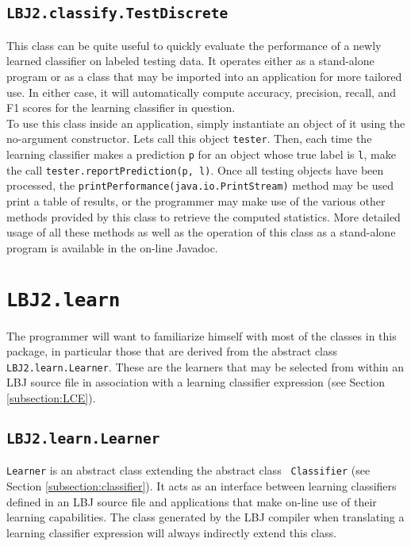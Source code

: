 \subsection{{\tt LBJ2.classify.TestDiscrete}} \label{subsection:testDiscrete}
This class can be quite useful to quickly evaluate the performance of a newly
learned classifier on labeled testing data.  It operates either as a
stand-alone program or as a class that may be imported into an application for
more tailored use.  In either case, it will automatically compute accuracy,
precision, recall, and F1 scores for the learning classifier in question. \\

To use this class inside an application, simply instantiate an object of it
using the no-argument constructor.  Lets call this object {\tt tester}.  Then,
each time the learning classifier makes a prediction {\tt p} for an object
whose true label is {\tt l}, make the call
{\tt tester.reportPrediction(p, l)}.  Once all testing objects have been
processed, the {\tt printPerformance(java.io.PrintStream)} method may be used
print a table of results, or the programmer may make use of the various other
methods provided by this class to retrieve the computed statistics.  More
detailed usage of all these methods as well as the operation of this class as
a stand-alone program is available in the on-line Javadoc.

\section{{\tt LBJ2.learn}}

The programmer will want to familiarize himself with most of the classes in
this package, in particular those that are derived from the abstract class
{\tt LBJ2.learn.Learner}.  These are the learners that may be selected from
within an LBJ source file in association with a learning classifier expression
(see Section \ref{subsection:LCE}).

\subsection{{\tt LBJ2.learn.Learner}} \label{subsection:learner}
{\tt Learner} is an abstract class extending the abstract class {\tt
Classifier} (see Section \ref{subsection:classifier}).  It acts as an
interface between learning classifiers defined in an LBJ source file and
applications that make on-line use of their learning capabilities.  The class
generated by the LBJ compiler when translating a learning classifier
expression will always indirectly extend this class. \\

